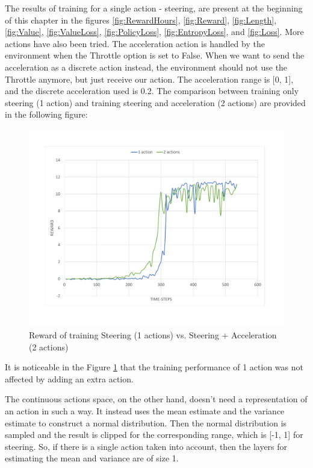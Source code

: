 The results of training for a single action - steering, are present at the beginning of this chapter in the figures \ref{fig:RewardHours}, \ref{fig:Reward}, \ref{fig:Length}, \ref{fig:Value}, \ref{fig:ValueLoss}, \ref{fig:PolicyLoss}, \ref{fig:EntropyLoss}, and \ref{fig:Loss}. More actions have also been tried. The acceleration action is handled by the environment when the Throttle option is set to False. When we want to send the acceleration as a discrete action instead, the environment should not use the Throttle anymore, but just receive our action. The acceleration range is [0, 1], and the discrete acceleration used is 0.2. The comparison between training only steering (1 action) and training steering and acceleration (2 actions) are provided in the following figure:
\begin{figure}[H]
	\centering
	\includegraphics[width=1\textwidth]{Figures/2Actions}
	\caption{Reward of training Steering (1 actions) vs. Steering + Acceleration (2 actions)}
	\label{fig:2Actions}
\end{figure}
It is noticeable in the Figure \ref{fig:2Actions} that the training performance of 1 action was not affected by adding an extra action.

The continuous actions space, on the other hand, doesn't need a representation of an action in such a way. It instead uses the mean estimate and the variance estimate to construct a normal distribution. Then the normal distribution is sampled and the result is clipped for the corresponding range, which is [-1, 1] for steering. So, if there is a single action taken into account, then the layers for estimating the mean and variance are of size 1.

